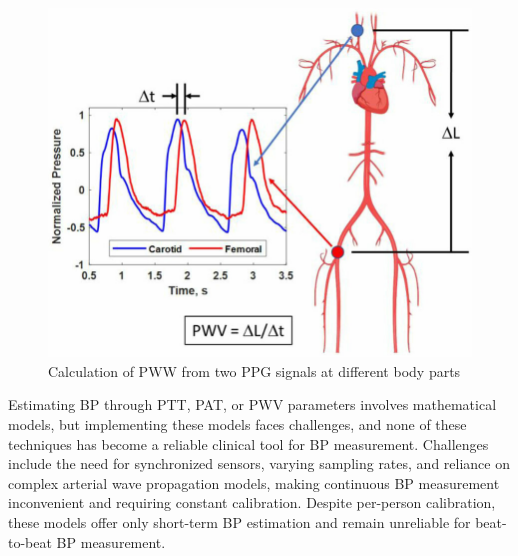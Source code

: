 \begin{figure}
    \begin{minipage}[c]{0.5\textwidth}
        \includegraphics[width=\textwidth]{images/sp/pww}
    \end{minipage}\hfill
    \begin{minipage}[c]{0.5\textwidth}
        \captionsetup{format=plain, justification=centering}
        \caption{Calculation of PWW from two PPG signals at different body parts~\cite{urbanUnderstandingArterialBiomechanics2023}}
        \label{fig:pww}
    \end{minipage}
\end{figure}

Estimating BP through PTT, PAT, or PWV parameters involves mathematical models, but implementing these models faces challenges, and none of these techniques has become a reliable clinical tool for BP measurement.
Challenges include the need for synchronized sensors, varying sampling rates, and reliance on complex arterial wave propagation models, making continuous BP measurement inconvenient and requiring constant calibration.
Despite per-person calibration, these models offer only short-term BP estimation and remain unreliable for beat-to-beat BP measurement.

